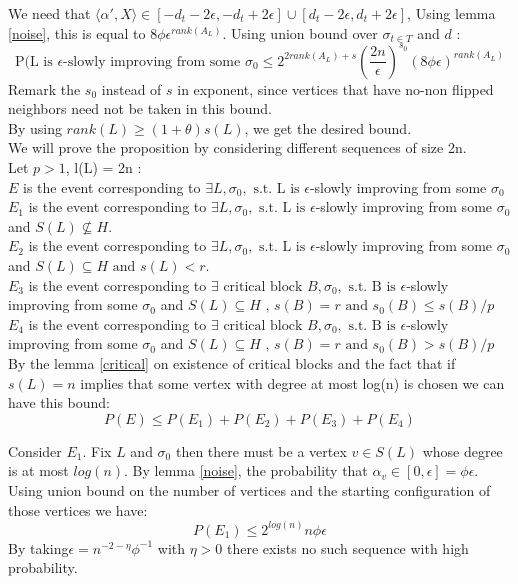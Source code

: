 \documentclass[12pt]{article}
\begin{document}
We need that $ \langle\alpha ', X \rangle \in [- d_t -2\epsilon, -d_t + 2\epsilon] \cup [d_t - 2\epsilon, d_t + 2\epsilon]$, Using lemma \ref{noise}, this is equal to $8\phi\epsilon^{rank(A_L)}$. Using union bound over $\sigma_{t \in T}$ and $d$ :
\begin{equation*}
\text{P(L is }\epsilon\text{-slowly improving from some }\sigma_0 \leq 2^{2rank(A_L) + s}(\frac{2n}{\epsilon})^{s_0}(8\phi\epsilon)^{rank(A_L)}
\end{equation*}
Remark the $s_0$ instead of $s$ in exponent, since vertices that have no-non flipped neighbors need not be taken in this bound. \\
By using  $rank(L) \geq (1+\theta)s(L)$, we get the desired bound. \\

We will prove the proposition by considering different sequences of size 2n.\\
Let $ p > 1$, l(L) = 2n : \\
$E$ is the event corresponding to $\exists L, \sigma_0, \text{ s.t. L is }\epsilon$-slowly improving from some $\sigma_0 $\\
$E_1$ is the event corresponding to $\exists L, \sigma_0, \text{ s.t. L is }\epsilon$-slowly improving from some $\sigma_0$ and $S(L) \not\subseteq H$.\\
$E_2$ is the event corresponding to $\exists L, \sigma_0,\text{ s.t. L is }\epsilon$-slowly improving from some $\sigma_0$ and $S(L) \subseteq H\text{ and }s(L) < r$. \\
$E_3$   is the event corresponding to $\exists \text{ critical block } B, \sigma_0,\text{ s.t. B is }\epsilon$-slowly improving from some $\sigma_0$ and $S(L) \subseteq H \text{ , } s(B) = r \text{ and } s_0(B) \leq s(B) / p$ \\
$E_4$   is the event corresponding to $\exists \text{ critical block } B, \sigma_0,\text{ s.t. B is }\epsilon$-slowly improving from some $\sigma_0$ and $S(L) \subseteq H \text{ , } s(B) = r \text{ and } s_0(B) > s(B) / p$ \\
By the lemma \ref{critical} on existence of critical blocks and the fact that if $s(L) = n$ implies that some vertex with degree at most log(n) is chosen we can have this bound:
\begin{equation*}
P(E) \leq P(E_1) + P(E_2) + P(E_3) + P(E_4)
\end{equation*}


Consider $E_1$. Fix $L$ and $\sigma_0$ then there must be a vertex $v \in S(L)$ whose degree is at most $log(n)$. By lemma  \ref{noise}, the probability that $\alpha_v \in [0, \epsilon] = \phi \epsilon$. Using union bound on the number of vertices and the starting configuration of those vertices we have:
\begin{equation}
P(E_1)  \leq 2^{log(n)}n \phi \epsilon
\end{equation}
By taking$\epsilon = n^{-2 - \eta} \phi^{-1}$ with $\eta > 0$ there exists no such sequence with high probability. \\
\end{document}
